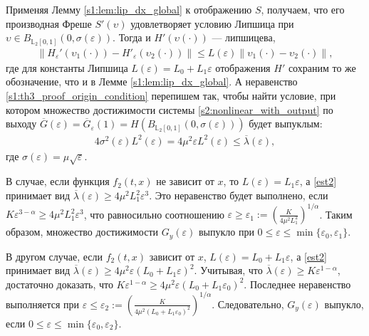 \documentclass[../main.tex]{subfiles}
\begin{document}
 \doc
 Применяя Лемму \ref{s1:lem:lip_dx_global} к отображению $S$, получаем, что его производная Фреше $S'(\upsilon)$ удовлетворяет условию Липшица
 при $ \upsilon \in B_{\mathbb{L}_2[0,1]}(0,\sigma(\varepsilon)) $.
 Тогда и $ H'(\upsilon(\cdot)) $ --- липшицева, 
 \begin{gather*}
 \left\| H_{\varepsilon}'(\upsilon_1(\cdot)) - H'_{\varepsilon}(\upsilon_2(\cdot)) \right\| \leqslant L(\varepsilon) \left\| \upsilon_1(\cdot) - \upsilon_2(\cdot)\right\|,
 \end{gather*}
 где для константы Липшица $ L(\varepsilon) = L_0 + L_1 \varepsilon$ отображения $ H' $ сохраним то же обозначение, что и в Лемме \ref{s1:lem:lip_dx_global}.
 А неравенство \eqref{s1:th3_proof_origin_condition} перепишем так, чтобы найти условие, при котором множество достижимости системы \eqref{s2:nonlinear_with_output} по выходу $ \overline{G}(\varepsilon) = \overline{G}_{\varepsilon}(1) = H (B_{\mathbb{L}_2[0,1]}(0,\sigma(\varepsilon)))$ будет выпуклым:
 \begin{gather}\label{est2}
 4\sigma^2(\varepsilon)L^2(\varepsilon) = 4\mu^2\varepsilon L^2(\varepsilon) \leqslant \overline{\lambda}(\varepsilon),
 \end{gather}
 где $ \sigma(\varepsilon) = \mu\sqrt{\varepsilon} $.
 
 В случае, если функция $ f_2(t,x) $ не зависит от $ x $, то $ L(\varepsilon) = L_1 \varepsilon $, а \eqref{est2} принимает вид $ \overline{\lambda}(\varepsilon) \geqslant 4\mu^2L_1^2 \varepsilon^3 $. 
Это неравенство будет выполнено, если $ K\varepsilon^{3 - \alpha} \geqslant 4\mu^2L_1^2 \varepsilon^3 $, что равносильно соотношению $ \varepsilon \geqslant \varepsilon_1 := \left(\frac{K}{4\mu^2L_1^2}\right)^{1/\alpha} $. 
Таким образом, множество достижимости $ G_y(\varepsilon)$ выпукло при $ 0 \leqslant \varepsilon \leqslant \min\{\varepsilon_0,\varepsilon_1\} $. 
 
 В другом случае, если $ f_2(t,x) $ зависит от $ x $, $ L(\varepsilon) =L_0+L_1\varepsilon $, а \eqref{est2} принимает вид $ \overline{\lambda}(\varepsilon) \geqslant 4\mu^2 \varepsilon (L_0 + L_1 \varepsilon)^2 $. 
Учитывая, что $ \overline{\lambda}(\varepsilon) \geqslant K \varepsilon^{1-\alpha} $, достаточно доказать, что $ K \varepsilon^{1-\alpha} \geqslant 4\mu^2 \varepsilon (L_0 + L_1 \varepsilon_0)^2 $. 
Последнее неравенство выполняется при $ \varepsilon \leqslant \varepsilon_2 := \left(\frac{K}{4\mu^2(L_0 + L_1\varepsilon_0)^2} \right)^{1/\alpha} $. 
Следовательно, $ G_y(\varepsilon) $ выпукло, если $ 0 \leqslant \varepsilon \leqslant \min\{\varepsilon_0, \varepsilon_2\} $.
 
\end{document}
